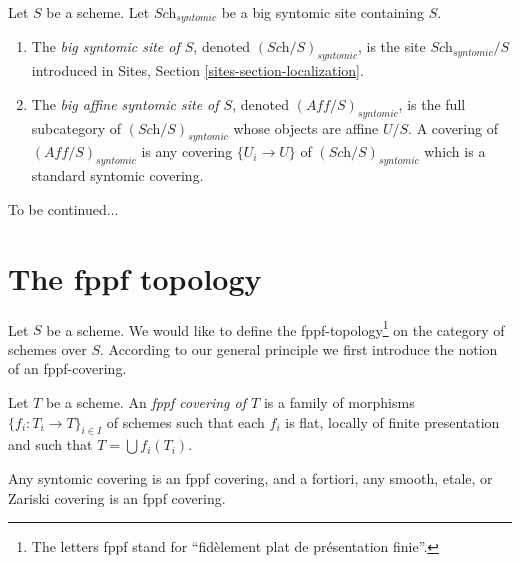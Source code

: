 \begin{definition}
\label{definition-big-small-syntomic}
Let $S$ be a scheme. Let $\textit{Sch}_{syntomic}$ be a big syntomic
site containing $S$.
\begin{enumerate}
\item The {\it big syntomic site of $S$}, denoted
$(\textit{Sch}/S)_{syntomic}$, is the site $\textit{Sch}_{syntomic}/S$
introduced in Sites, Section \ref{sites-section-localization}.
\item The {\it big affine syntomic site of $S$}, denoted
$(\textit{Aff}/S)_{syntomic}$, is the full subcategory of
$(\textit{Sch}/S)_{syntomic}$ whose objects are affine $U/S$.
A covering of $(\textit{Aff}/S)_{syntomic}$ is any covering
$\{U_i \to U\}$ of $(\textit{Sch}/S)_{syntomic}$ which is a
standard syntomic covering.
\end{enumerate}
\end{definition}

\noindent
To be continued...














\section{The fppf topology}
\label{section-fppf}

\noindent
Let $S$ be a scheme. We would like to define the fppf-topology\footnote{
The letters fppf stand for ``fid\`element plat de pr\'esentation finie''.} on
the category of schemes over $S$. According to our general principle
we first introduce the notion of an fppf-covering.

\begin{definition}
\label{definition-fppf-covering}
Let $T$ be a scheme. An {\it fppf covering of $T$} is a family
of morphisms $\{f_i : T_i \to T\}_{i \in I}$ of schemes
such that each $f_i$ is flat, locally of finite presentation and such
that $T = \bigcup f_i(T_i)$.
\end{definition}

\begin{lemma}
\label{lemma-zariski-etale-smooth-syntomic-fppf}
Any syntomic covering is an fppf covering, and a fortiori,
any smooth, etale, or Zariski covering is an fppf covering.
\end{lemma}

